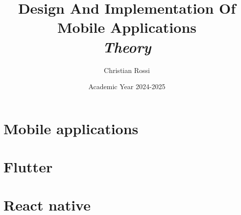 \documentclass[12pt, a4paper]{report}
\title{\textbf{Design And Implementation Of Mobile Applications} \\ \textit{Theory}}
\author{Christian Rossi}
\date{Academic Year 2024-2025}
\begin{document}
    \maketitle

    

    \cleardoublepage

    \tableofcontents

    \cleardoublepage

    \chapter{Mobile applications}
    
    

    \chapter{Flutter}
    
    
    

    \chapter{React native}
    
\end{document}
